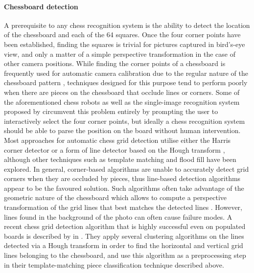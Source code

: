 \paragraph{Chessboard detection}
A prerequisite to any chess recognition system is the ability to detect the location of the chessboard and each of the 64 squares. 
Once the four corner points have been established, finding the squares is trivial for pictures captured in bird's-eye view, and only a matter of a simple perspective transformation in the case of other camera positions.
While finding the corner points of a chessboard is frequently used for automatic camera calibration due to the regular nature of the chessboard pattern \cite{delaescalera2010,bennett2014}, techniques designed for this purpose tend to perform poorly when there are pieces on the chessboard that occlude lines or corners.
Some of the aforementioned chess robots \cite{goncalves2005,sokic2008,khan2014} as well as the single-image recognition system proposed by \textcite{danner2015} circumvent this problem entirely by prompting the user to interactively select the four corner points, but ideally a chess recognition system should be able to parse the position on the board without human intervention.
Most approaches for automatic chess grid detection utilise either the Harris corner detector \cite{banerjee2012,hack2014} or a form of line detector based on the Hough transform \cite{tam2008,neufeld2010,danner2015,chen2016,kanchibail2016,xie2018a,chen2019}, although other techniques such as template matching \cite{matuszek2011} and flood fill \cite{wang2013} have been explored.
In general, corner-based algorithms are unable to accurately detect grid corners when they are occluded by pieces, thus line-based detection algorithms appear to be the favoured solution.
Such algorithms often take advantage of the geometric nature of the chessboard which allows to compute a perspective transformation of the grid lines that best matches the detected lines \cite{tam2008,hack2014,xie2018}.
However, lines found in the background of the photo can often cause failure modes.
A recent chess grid detection algorithm that is highly successful even on populated boards is described by \citeauthor{xie2018a} in \cite{xie2018a}. 
They apply several clustering algorithms on the lines detected via a Hough transform in order to find the horizontal and vertical grid lines belonging to the chessboard, and use this algorithm as a preprocessing step in their template-matching piece classification technique \cite{xie2018} described above. 

